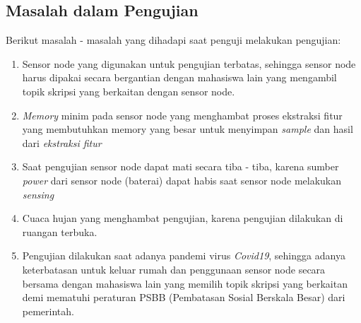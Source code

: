 \subsection{Masalah dalam Pengujian}
Berikut masalah - masalah yang dihadapi saat penguji melakukan pengujian:
\begin{enumerate}
	\item Sensor node yang digunakan untuk pengujian terbatas, sehingga sensor node harus dipakai secara bergantian dengan mahasiswa lain yang 
		mengambil topik skripsi yang berkaitan dengan sensor node. 
	\item {\it Memory} minim pada sensor node yang menghambat proses ekstraksi fitur yang membutuhkan memory yang besar untuk menyimpan {\it sample} dan hasil dari {\it ekstraksi fitur}
	\item Saat pengujian sensor node dapat mati secara tiba - tiba, karena sumber {\it power} dari sensor node (baterai) dapat habis saat sensor node melakukan {\it sensing}
	\item Cuaca hujan yang menghambat pengujian, karena pengujian dilakukan di ruangan terbuka. 
	\item Pengujian dilakukan saat adanya pandemi virus {\it Covid19}, sehingga adanya keterbatasan untuk keluar rumah dan penggunaan sensor node
		secara bersama dengan mahasiswa lain yang memilih topik skripsi yang berkaitan demi mematuhi peraturan PSBB (Pembatasan Sosial Berskala Besar) dari pemerintah.  
\end{enumerate}
	


